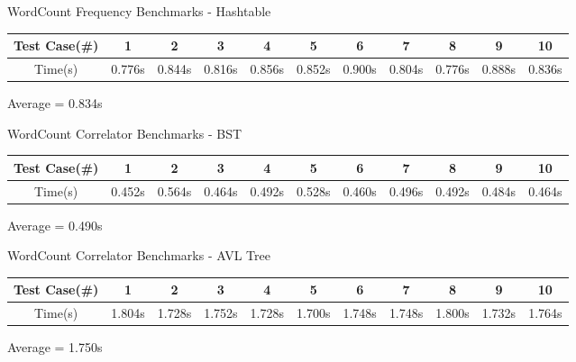 \documentclass[12pt, oneside, letter]{article}
\newcommand{\env}[2]{
    \begin{#1}
        #2
    \end{#1}
}
\begin{document}
    \env{center} {
        WordCount Frequency Benchmarks - Hashtable

        \vspace*{0.1in}

        \begin{tabular}{|c|c|c|c|c|c|c|c|c|c|c|}
            \hline
            Test Case(\#) & 1      & 2      & 3      & 4      & 5      & 6      & 7      & 8      & 9      & 10 \\
            \hline
            Time(s)       & 0.776s & 0.844s & 0.816s & 0.856s & 0.852s & 0.900s & 0.804s & 0.776s & 0.888s & 0.836s\\
            \hline
        \end{tabular}

        \vspace*{0.1in}

        Average = 0.834s
    }

    \env{center} {
        WordCount Correlator Benchmarks - BST

        \vspace*{0.1in}

        \begin{tabular}{|c|c|c|c|c|c|c|c|c|c|c|}
            \hline
            Test Case(\#) & 1      & 2      & 3      & 4      & 5      & 6      & 7      & 8      & 9      & 10 \\
            \hline
            Time(s)       & 0.452s & 0.564s & 0.464s & 0.492s & 0.528s & 0.460s & 0.496s & 0.492s & 0.484s & 0.464s\\
            \hline
        \end{tabular}

        \vspace*{0.1in}

        Average = 0.490s
    }

    \env{center} {
        WordCount Correlator Benchmarks - AVL Tree

        \vspace*{0.1in}

        \begin{tabular}{|c|c|c|c|c|c|c|c|c|c|c|}
            \hline
            Test Case(\#) & 1      & 2      & 3      & 4      & 5      & 6      & 7      & 8      & 9      & 10 \\
            \hline
            Time(s)       & 1.804s & 1.728s & 1.752s & 1.728s & 1.700s & 1.748s & 1.748s & 1.800s & 1.732s & 1.764s\\
            \hline
        \end{tabular}

        \vspace*{0.1in}

        Average = 1.750s
    }
\end{document}
